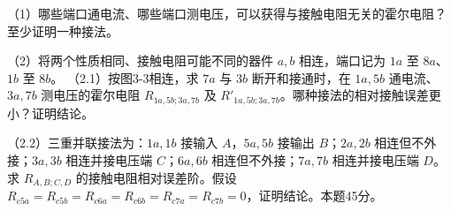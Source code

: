 \documentclass[12pt,a4paper,fontset=fandol]{ctexart}
\begin{document}
（1）哪些端口通电流、哪些端口测电压，可以获得与接触电阻无关的霍尔电阻？至少证明一种接法。

（2）将两个性质相同、接触电阻可能不同的器件 \(a,b\) 相连，端口记为
\(1a\) 至 \(8a\)、\(1b\) 至 \(8b\)。 （2.1）按图3-3相连，求 \(7a\) 与
\(3b\) 断开和接通时，在 \(1a,5b\) 通电流、\(3a,7b\) 测电压的霍尔电阻
\(R_{1a,5b;3a,7b}\) 及
\(R'_{1a,5b;3a,7b}\)。哪种接法的相对接触误差更小？证明结论。

\begin{center}
\begin{minipage}{\linewidth}
\centering\begingroup
{}
\ifdim\wd\diagrambox>.88\linewidth
\sbox{\diagrambox}{\resizebox{.88\linewidth}{!}{\usebox{\diagrambox}}}
\fi
\ifdim\ht\diagrambox>.40\textheight
\resizebox{!}{.40\textheight}{\usebox{\diagrambox}}
\else\usebox{\diagrambox}\fi
\par{}
\endgroup\end{minipage}
\end{center}

（2.2）三重并联接法为：\(1a,1b\) 接输入 \(A\)，\(5a,5b\) 接输出
\(B\)；\(2a,2b\) 相连但不外接；\(3a,3b\) 相连并接电压端 \(C\)；\(6a,6b\)
相连但不外接；\(7a,7b\) 相连并接电压端 \(D\)。求 \(R_{A,B;C,D}\)
的接触电阻相对误差阶。假设
\(R_{c5a}=R_{c5b}=R_{c6a}=R_{c6b}=R_{c7a}=R_{c7b}=0\)，证明结论。本题45分。
\end{document}
